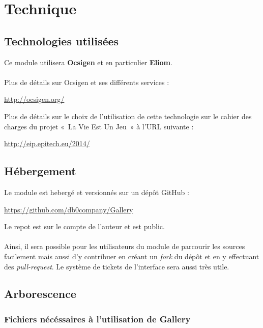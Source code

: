 \documentclass{life-fr}
\begin{document}
\chapter{Technique}

\section{Technologies utilisées}

Ce module utilisera \textbf{Ocsigen} et en particulier \textbf{Eliom}.\\
\\
Plus de détails sur Ocsigen et ses différents services :
\begin{center}
  \url{http://ocsigen.org/}
\end{center}

Plus de détails sur le choix de l'utilisation de cette technologie sur
le cahier des charges du projet «~La Vie Est Un Jeu~» à l'URL suivante :\\
\begin{center}
  \url{http://eip.epitech.eu/2014/}
\end{center}

\section{Hébergement}

Le module est hebergé et versionnés sur un dépôt GitHub :

\begin{center}
  \url{https://github.com/db0company/Gallery}
\end{center}

Le repot est sur le compte de l'auteur et est public.\\
\\
Ainsi, il sera possible pour les utilisateurs du module de parcourir les
sources facilement mais aussi d'y contribuer en créant un \textit{fork}
du dépôt et en y effectuant des \textit{pull-request}. Le système de
tickets de l'interface sera aussi très utile.

\newpage

\section{Arborescence}

\subsection{Fichiers nécéssaires à l'utilisation de Gallery}
\end{document}
